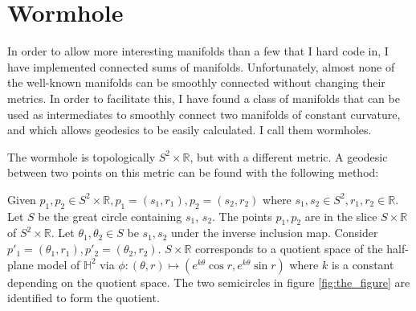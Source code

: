 \section{Wormhole}
\label{Wormhole}


In order to allow more interesting manifolds than a few that I hard code in, I have implemented connected sums of manifolds. Unfortunately, almost none of the well-known manifolds can be smoothly connected without changing their metrics. In order to facilitate this, I have found a class of manifolds that can be used as intermediates to smoothly connect two manifolds of constant curvature, and which allows geodesics to be easily calculated. I call them wormholes.

The wormhole is topologically $S^2 \times \mathbb{R}$, but with a different metric. A geodesic between two points on this metric can be found with the following method:

Given $p_1, p_2 \in S^2 \times \mathbb{R}, p_1 = (s_1,r_1),p_2 = (s_2,r_2)$ where $s_1,s_2 \in S^2, r_1,r_2 \in \mathbb{R}$.
Let $S$ be the great circle containing $s_1$, $s_2$.
The points $p_1, p_2$ are in the slice $S \times \mathbb{R}$ of $S^2 \times \mathbb{R}$.
Let $\theta_1, \theta_2 \in S$ be $s_1, s_2$ under the inverse inclusion map.
Consider $p'_1 = (\theta_1,r_1), p'_2 = (\theta_2,r_2)$.
$S \times \mathbb{R}$ corresponds to a quotient space of the half-plane model of $\mathbb{H}^2$ via $\phi:(\theta,r) \mapsto (e^{k\theta} \cos r, e^{k\theta} \sin r)$ where $k$ is a constant depending on the quotient space.
The two semicircles in figure \ref{fig:the_figure} are identified to form the quotient.

